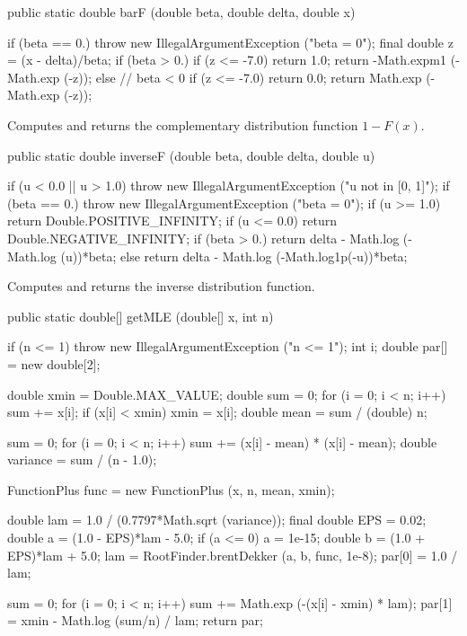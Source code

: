 \begin{code}

   public static double barF (double beta, double delta, double x)\begin{hide} {
      if (beta == 0.)
         throw new IllegalArgumentException ("beta = 0");
      final double z = (x - delta)/beta;
      if (beta > 0.) {
         if (z <= -7.0)
            return 1.0;
         return -Math.expm1 (-Math.exp (-z));
      } else {   // beta < 0
          if (z <= -7.0)
            return 0.0;
         return Math.exp (-Math.exp (-z));
      }
   }\end{hide}
\end{code}
 \begin{tabb}
  Computes and returns  the complementary distribution function $1 - F(x)$.
 \end{tabb}
\begin{code}

   public static double inverseF (double beta, double delta, double u)\begin{hide} {
       if (u < 0.0 || u > 1.0)
          throw new IllegalArgumentException ("u not in [0, 1]");
      if (beta == 0.)
         throw new IllegalArgumentException ("beta = 0");
       if (u >= 1.0)
           return Double.POSITIVE_INFINITY;
       if (u <= 0.0)
           return Double.NEGATIVE_INFINITY;
       if (beta > 0.)
          return delta - Math.log (-Math.log (u))*beta;
       else
          return delta - Math.log (-Math.log1p(-u))*beta;
   }\end{hide}
\end{code}
  \begin{tabb}
  Computes and returns the inverse distribution function.
 \end{tabb}
\begin{code}

   public static double[] getMLE (double[] x, int n)\begin{hide} {
      if (n <= 1)
         throw new IllegalArgumentException ("n <= 1");
      int i;
      double par[] = new double[2];

      double xmin = Double.MAX_VALUE;
      double sum = 0;
      for (i = 0; i < n; i++) {
         sum += x[i];
         if (x[i] < xmin)
            xmin = x[i];
      }
      double mean = sum / (double) n;

      sum = 0;
      for (i = 0; i < n; i++)
         sum += (x[i] - mean) * (x[i] - mean);
      double variance = sum / (n - 1.0);

      FunctionPlus func = new FunctionPlus (x, n, mean, xmin);

      double lam = 1.0 / (0.7797*Math.sqrt (variance));
      final double EPS = 0.02;
      double a = (1.0 - EPS)*lam - 5.0;
      if (a <= 0)
         a = 1e-15;
      double b = (1.0 + EPS)*lam + 5.0;
      lam = RootFinder.brentDekker (a, b, func, 1e-8);
      par[0] = 1.0 / lam;

      sum = 0;
      for (i = 0; i < n; i++)
           sum += Math.exp (-(x[i] - xmin) * lam);
      par[1] = xmin - Math.log (sum/n) / lam;
      return par;
   }\end{hide}
\end{code}
